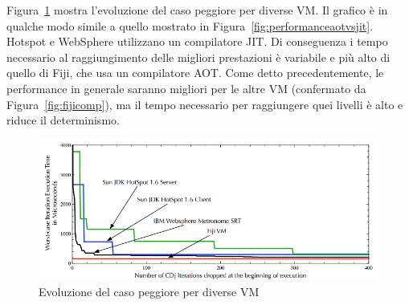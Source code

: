 Figura~\ref{fig:fijistartup} mostra l'evoluzione del caso peggiore per diverse VM. Il grafico è in qualche modo simile a quello mostrato in Figura~\ref{fig:performanceaotvsjit}. Hotspot e WebSphere utilizzano un compilatore JIT. Di conseguenza i tempo necessario al raggiungimento delle migliori prestazioni è variabile e più alto di quello di Fiji, che usa un compilatore AOT. Come detto precedentemente, le performance in generale saranno migliori per le altre VM (confermato da Figura~\ref{fig:fijicomp}), ma il tempo necessario per raggiungere quei livelli è alto e riduce il determinismo.
\begin{figure}[h]
	\centering
	\includegraphics[width=0.8\linewidth]{images/fijistartup}
	\caption[Evoluzione del caso peggiore]{Evoluzione del caso peggiore per diverse VM}
	\label{fig:fijistartup}
\end{figure}
